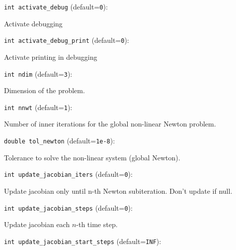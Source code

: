 \item\verb+int activate_debug+ {\rm(default=\verb|0|)}:

Activate debugging

\item\verb+int activate_debug_print+ {\rm(default=\verb|0|)}:

Activate printing in debugging

\item\verb+int ndim+ {\rm(default=\verb|3|)}:

Dimension of the problem.

\item\verb+int nnwt+ {\rm(default=\verb|1|)}:

Number of inner iterations for the global non-linear
Newton  problem. 

\item\verb+double tol_newton+ {\rm(default=\verb|1e-8|)}:

Tolerance to solve the non-linear system (global Newton).

\item\verb+int update_jacobian_iters+ {\rm(default=\verb|0|)}:

Update jacobian only until n-th Newton subiteration. 
Don't update if null. 

\item\verb+int update_jacobian_steps+ {\rm(default=\verb|0|)}:

Update jacobian each $n$-th time step. 

\item\verb+int update_jacobian_start_steps+ {\rm(default=\verb|INF|)}:

